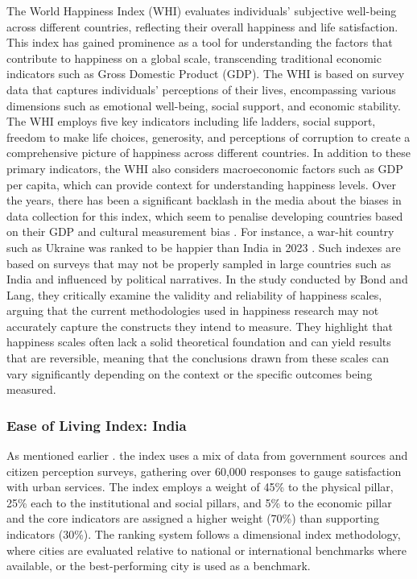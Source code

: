 The World Happiness Index (WHI) \cite{carlsen2018happiness} evaluates individuals' subjective well-being across different countries, reflecting their overall happiness and life satisfaction. This index has gained prominence as a tool for understanding the factors that contribute to happiness on a global scale, transcending traditional economic indicators such as Gross Domestic Product (GDP). The WHI is based on survey data that captures individuals' perceptions of their lives, encompassing various dimensions such as emotional well-being, social support, and economic stability. The WHI employs five key indicators including life ladders, social support, freedom to make life choices, generosity, and perceptions of corruption to create a comprehensive picture of happiness across different countries.  
In addition to these primary indicators, the WHI also considers macroeconomic factors such as GDP per capita, which can provide context for understanding happiness levels. Over the years, there has been a significant backlash in the media about the biases in data collection for this index, which seem to penalise developing countries based on their GDP \cite{GDP_Bias} and cultural measurement bias \cite{Cultural_bias}. For instance, a war-hit country such as Ukraine was ranked to be happier than India in 2023 \cite{newindianexpress2023happiness}. Such indexes are based on surveys that may not be properly sampled in large countries such as India and influenced by political narratives. In the study conducted by Bond and Lang, they critically examine the validity and reliability of happiness scales, arguing that the current methodologies used in happiness research may not accurately capture the constructs they intend to measure\cite{Bond_Lang}. They highlight that happiness scales often lack a solid theoretical foundation and can yield results that are reversible, meaning that the conclusions drawn from these scales can vary significantly depending on the context or the specific outcomes being measured.

\subsubsection{Ease of Living Index: India}


As mentioned earlier \cite{mohua2018ease}. the index uses a mix of data from government sources and citizen perception surveys, gathering over 60,000 responses to gauge satisfaction with urban services. The index employs a weight of 45\% to the physical pillar, 25\% each to the institutional and social pillars, and 5\% to the economic pillar and the core indicators are assigned a higher weight (70\%) than supporting indicators (30\%). The ranking system follows a dimensional index methodology, where cities are evaluated relative to national or international benchmarks where available, or the best-performing city is used as a benchmark.

